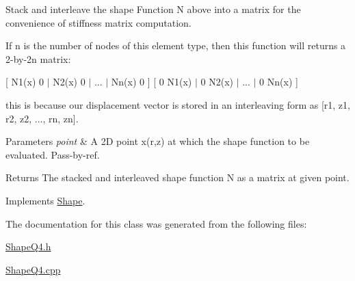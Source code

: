 Stack and interleave the shape Function N above into a matrix for the convenience of stiffness matrix computation. 

If n is the number of nodes of this element type, then this function will returns a 2-\/by-\/2n matrix\+:

\mbox{[} N1(x) 0 $\vert$ N2(x) 0 $\vert$ ... $\vert$ Nn(x) 0 \mbox{]} \mbox{[} 0 N1(x) $\vert$ 0 N2(x) $\vert$ ... $\vert$ 0 Nn(x) \mbox{]}

this is because our displacement vector is stored in an interleaving form as \mbox{[}r1, z1, r2, z2, ..., rn, zn\mbox{]}.


\begin{DoxyParams}{Parameters}
{\em point} & A 2D point x(r,z) at which the shape function to be evaluated. Pass-\/by-\/ref. \\
\hline
\end{DoxyParams}
\begin{DoxyReturn}{Returns}
The stacked and interleaved shape function N as a matrix at given point. 
\end{DoxyReturn}


Implements \mbox{\hyperlink{class_shape_a7a2dc7c642bdea2a1359e3795fd9414d}{Shape}}.



The documentation for this class was generated from the following files\+:\begin{DoxyCompactItemize}
\item 
\mbox{\hyperlink{_shape_q4_8h}{Shape\+Q4.\+h}}\item 
\mbox{\hyperlink{_shape_q4_8cpp}{Shape\+Q4.\+cpp}}\end{DoxyCompactItemize}
